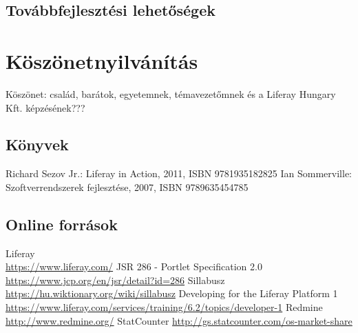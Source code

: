 \documentclass[hidelinks, 12pt, a4paper]{report}
\begin{document}
\section{Továbbfejlesztési lehetőségek}

\clearpage
{}
\chapter*{Köszönetnyilvánítás}

Köszönet: család, barátok, egyetemnek, témavezetőmnek és a Liferay Hungary Kft. képzésének???


\clearpage
{}
\begin{thebibliography}{10}

\section*{Könyvek}

 Richard Sezov Jr.: Liferay in Action, 2011, ISBN 9781935182825
 Ian Sommerville: Szoftverrendszerek fejlesztése, 2007, ISBN 9789635454785

\section*{Online források}

 Liferay \\ \small\url{https://www.liferay.com/}
 JSR 286 - Portlet Specification 2.0 \\ \small\url{https://www.jcp.org/en/jsr/detail?id=286}
 Sillabusz \\ \small\url{https://hu.wiktionary.org/wiki/sillabusz}
 Developing for the Liferay Platform 1 \\ \small\url{https://www.liferay.com/services/training/6.2/topics/developer-1}
 Redmine \\ \small\url{http://www.redmine.org/}
 StatCounter \small\url{http://gs.statcounter.com/os-market-share}

\end{thebibliography}
\end{document}
